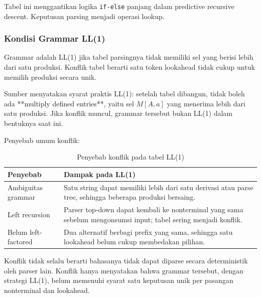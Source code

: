 Tabel ini menggantikan logika \texttt{if-else} panjang dalam predictive recursive descent. Keputusan parsing menjadi operasi lookup.

\subsubsection{Kondisi Grammar LL(1)}

\begin{jawab}
Grammar adalah LL(1) jika tabel parsingnya tidak memiliki sel yang berisi lebih dari satu produksi. Konflik tabel berarti satu token lookahead tidak cukup untuk memilih produksi secara unik.
\end{jawab}

Sumber menyatakan syarat praktis LL(1): setelah tabel dibangun, tidak boleh ada **multiply defined entries**, yaitu sel $M[A,a]$ yang menerima lebih dari satu produksi. Jika konflik muncul, grammar tersebut bukan LL(1) dalam bentuknya saat ini.

Penyebab umum konflik:

\begin{table}[H]
\centering
\begin{tabularx}{\textwidth}{|L{0.25\textwidth}|X|}
\hline
\textbf{Penyebab} & \textbf{Dampak pada LL(1)} \\
\hline
Ambiguitas grammar & Satu string dapat memiliki lebih dari satu derivasi atau parse tree, sehingga beberapa produksi bersaing. \\
\hline
Left recursion & Parser top-down dapat kembali ke nonterminal yang sama sebelum mengonsumsi input; tabel sering menjadi konflik. \\
\hline
Belum left-factored & Dua alternatif berbagi prefix yang sama, sehingga satu lookahead belum cukup membedakan pilihan. \\
\hline
\end{tabularx}
\caption{Penyebab konflik pada tabel LL(1)}
\label{tab:konflik-ll1}
\end{table}

Konflik tidak selalu berarti bahasanya tidak dapat diparse secara deterministik oleh parser lain. Konflik hanya menyatakan bahwa grammar tersebut, dengan strategi LL(1), belum memenuhi syarat satu keputusan unik per pasangan nonterminal dan lookahead.


